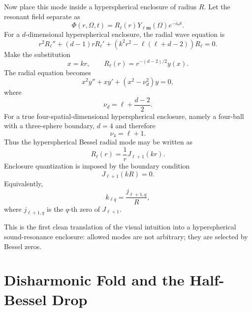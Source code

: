 \documentclass[11pt,a4paper]{article}
\renewcommand{\boxed}[1]{#1}
\begin{document}
Now place this mode inside a hyperspherical enclosure of radius $R$. Let the resonant field separate as
\begin{equation}
 \Phi(r,\Omega,t)=R_\ell(r)Y_{\ell\mathbf m}(\Omega)e^{-i\omega t}.
\label{eq:field-separation}
\end{equation}
For a $d$-dimensional hyperspherical enclosure, the radial wave equation is
\begin{equation}
 r^2R_\ell''+(d-1)rR_\ell'+\left(k^2r^2-\ell(\ell+d-2)\right)R_\ell=0.
\label{eq:d-radial}
\end{equation}
Make the substitution
\begin{equation}
 x=kr,\qquad R_\ell(r)=r^{-(d-2)/2}y(x).
\label{eq:radial-substitution}
\end{equation}
The radial equation becomes
\begin{equation}
\boxed{x^2y''+xy'+\left(x^2-\nu_d^2\right)y=0,}
\label{eq:hyperspherical-bessel}
\end{equation}
where
\begin{equation}
\boxed{\nu_d=\ell+\frac{d-2}{2}.}
\label{eq:nu-d}
\end{equation}
For a true four-spatial-dimensional hyperspherical enclosure, namely a four-ball with a three-sphere boundary, $d=4$ and therefore
\begin{equation}
\boxed{\nu_4=\ell+1.}
\label{eq:nu-four}
\end{equation}
Thus the hyperspherical Bessel radial mode may be written as
\begin{equation}
\boxed{R_\ell(r)=\frac{1}{r}J_{\ell+1}(kr).}
\label{eq:radial-four}
\end{equation}
Enclosure quantization is imposed by the boundary condition
\begin{equation}
\boxed{J_{\ell+1}(kR)=0.}
\label{eq:boundary-zero}
\end{equation}
Equivalently,
\begin{equation}
\boxed{k_{\ell q}=\frac{j_{\ell+1,q}}{R},}
\label{eq:k-zeros}
\end{equation}
where $j_{\ell+1,q}$ is the $q$-th zero of $J_{\ell+1}$.

This is the first clean translation of the visual intuition into a hyperspherical sound-resonance enclosure: allowed modes are not arbitrary; they are selected by Bessel zeros.

\section{Disharmonic Fold and the Half-Bessel Drop}
\end{document}
